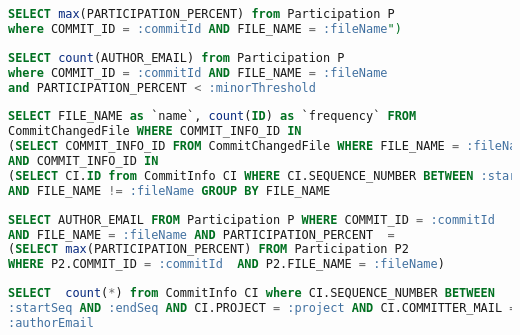 \begin{latin}
\begin{lstlisting}[language=SQL]
SELECT max(PARTICIPATION_PERCENT) from Participation P 
where COMMIT_ID = :commitId AND FILE_NAME = :fileName")
\end{lstlisting}
\end{latin}
\label{code:own}

\begin{latin}
\begin{lstlisting}[language=SQL]
SELECT count(AUTHOR_EMAIL) from Participation P 
where COMMIT_ID = :commitId AND FILE_NAME = :fileName
and PARTICIPATION_PERCENT < :minorThreshold
\end{lstlisting}
\end{latin}
\label{code:minor}



\begin{latin}
\begin{lstlisting}[language=SQL]
SELECT FILE_NAME as `name`, count(ID) as `frequency` FROM
CommitChangedFile WHERE COMMIT_INFO_ID IN
(SELECT COMMIT_INFO_ID FROM CommitChangedFile WHERE FILE_NAME = :fileName) 
AND COMMIT_INFO_ID IN
(SELECT CI.ID from CommitInfo CI WHERE CI.SEQUENCE_NUMBER BETWEEN :startSeq AND :endSeq AND PROJECT = :project)
AND FILE_NAME != :fileName GROUP BY FILE_NAME
\end{lstlisting}
\end{latin}
\label{code:neighbor}

\begin{latin}
\begin{lstlisting}[language=SQL]
SELECT AUTHOR_EMAIL FROM Participation P WHERE COMMIT_ID = :commitId 
AND FILE_NAME = :fileName AND PARTICIPATION_PERCENT  = 
(SELECT max(PARTICIPATION_PERCENT) FROM Participation P2 
WHERE P2.COMMIT_ID = :commitId  AND P2.FILE_NAME = :fileName)
\end{lstlisting}
\end{latin}
\label{code:find-owner}



\begin{latin}
\begin{lstlisting}[language=SQL]
SELECT  count(*) from CommitInfo CI where CI.SEQUENCE_NUMBER BETWEEN
:startSeq AND :endSeq AND CI.PROJECT = :project AND CI.COMMITTER_MAIL =
:authorEmail
\end{lstlisting}
\end{latin}
\label{code:commit-of-commiter}

